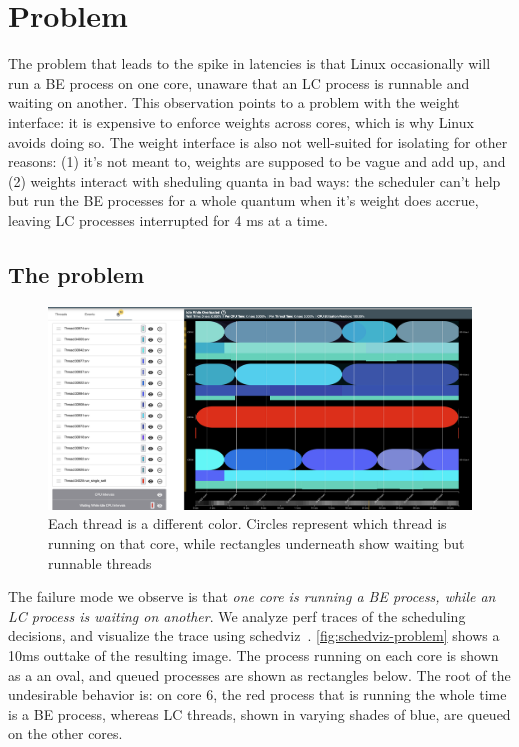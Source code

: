 \section{Problem}\label{s:problem}

The problem that leads to the spike in latencies is that Linux occasionally will
run a BE process on one core, unaware that an LC process is runnable and waiting
on another. This observation points to a problem with the \cgroups{} weight
interface: it is expensive to enforce weights across cores, which is why Linux
avoids doing so. The \cgroups{} weight interface is also not well-suited for
isolating for other reasons: (1) it's not meant to, weights are supposed to be
vague and add up, and (2) weights interact with sheduling quanta in bad ways:
the scheduler can't help but run the BE processes for a whole quantum when it's
weight does accrue, leaving LC processes interrupted for 4 ms at a
time.

\subsection{The problem}

\begin{figure}[t]
    \centering
    \includegraphics[width=\columnwidth]{graphs/schedviz-problem.png}
    \caption{Each thread is a different color. Circles represent which
    thread is running on that core, while rectangles underneath show waiting but
    runnable threads
    }\label{fig:schedviz-problem}
\end{figure}

The failure mode we observe is that \textit{one core is running a BE process,
while an LC process is waiting on another}. We analyze perf traces of the
scheduling decisions, and visualize the trace using schedviz~\cite{TODO}.
\autoref{fig:schedviz-problem} shows a 10ms outtake of the resulting image. The
process running on each core is shown as a an oval, and queued processes are
shown as rectangles below. The root of the undesirable behavior is: on core 6,
the red process that is running the whole time is a BE process, whereas LC
threads, shown in varying shades of blue, are queued on the other cores.

